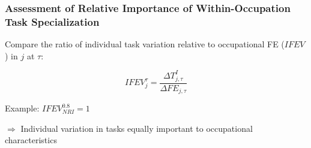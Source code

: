 \documentclass[10pt]{beamer}
\begin{document}








\begin{frame}[label=wi_spec] 
	\frametitle{Assessment of Relative Importance of Within-Occupation Task Specialization}
	
	
	
	
	
	Compare the ratio of individual task variation relative to occupational FE ($IFEV$) in $j$ at $\tau$: 
	
	\begin{equation} \label{ifev}
	IFEV_{j}^{\tau} = \frac{\Delta T_{j, \tau}^{I}}{\Delta FE_{j, \tau}}  
	\end{equation}
	
	\bigskip
	
	Example: $IFEV_{NRI}^{0.8} = 1$
	
	\medskip
	
	$\Longrightarrow$ Individual variation in tasks equally important to occupational characteristics  
	
	
\end{frame}
\end{document}
